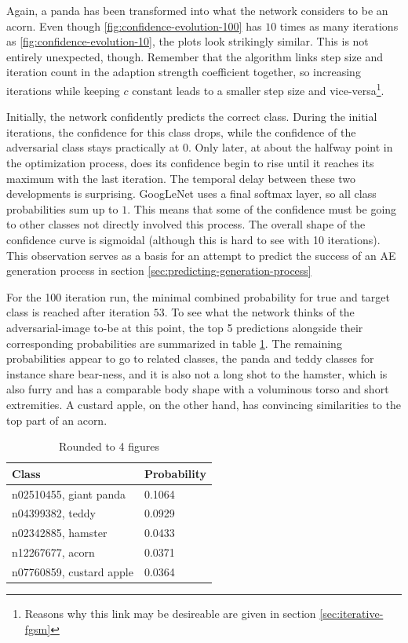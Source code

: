 \documentclass[11pt, a4paper]{article}
\begin{document}
Again, a panda has been transformed into what the network considers to be an acorn. Even though \ref{fig:confidence-evolution-100} has $10$ times as many iterations as \ref{fig:confidence-evolution-10}, the plots look strikingly similar. This is not entirely unexpected, though. Remember that the algorithm links step size and iteration count in the adaption strength coefficient together, so increasing iterations while keeping $c$ constant leads to a smaller step size and vice-versa\footnote{Reasons why this link may be desireable are given in section \ref{sec:iterative-fgsm}}.

Initially, the network confidently predicts the correct class. During the initial iterations, the confidence for this class drops, while the confidence of the adversarial class stays practically at $0$. Only later, at about the halfway point in the optimization process, does its confidence begin to rise until it reaches its maximum with the last iteration. The temporal delay between these two developments is surprising. GoogLeNet uses a final softmax layer, so all class probabilities sum up to $1$. This means that some of the confidence must be going to other classes not directly involved this process. The overall shape of the confidence curve is sigmoidal (although this is hard to see with 10 iterations). This observation serves as a basis for an attempt to predict the success of an AE generation process in section \ref{sec:predicting-generation-process}

For the 100 iteration run, the minimal combined probability for true and target class is reached after iteration $53$. To see what the network thinks of the adversarial-image to-be at this point, the top 5 predictions alongside their corresponding probabilities are summarized in table \ref{tab:ae-intermediate}. The remaining probabilities appear to go to related classes, the panda and teddy classes for instance share bear-ness, and it is also not a long shot to the hamster, which is also furry and has a comparable body shape with a voluminous torso and short extremities. A custard apple, on the other hand, has convincing similarities to the top part of an acorn.

\begin{table}[h!tb]
	\centering
	\begin{tabular}{|l|l|}
		\hline
		Class & Probability \\
		\hline
		n02510455, giant panda & 0.1064 \\
		n04399382, teddy & 0.0929 \\
		n02342885, hamster & 0.0433 \\
		n12267677, acorn & 0.0371 \\
		n07760859, custard apple & 0.0364 \\
		\hline
	\end{tabular}
	\caption{Rounded to 4 figures}
	\label{tab:ae-intermediate}
\end{table}
\end{document}
